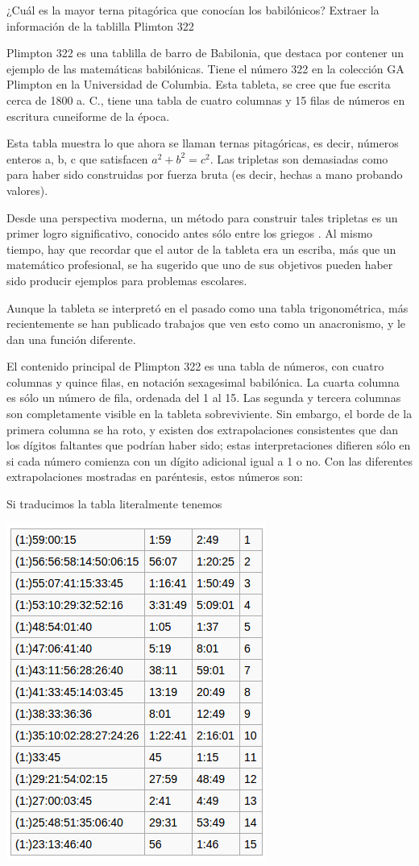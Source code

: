 \begin{problem}[3]
¿Cuál es la mayor terna pitagórica que conocían los babilónicos? Extraer la información de la tablilla Plimton 322

\solution

Plimpton 322 es una tablilla de barro de Babilonia, que destaca por contener un ejemplo de las matemáticas babilónicas. Tiene el número 322 en la colección GA Plimpton en la Universidad de Columbia. Esta tableta, se cree que fue escrita cerca de 1800 a. C., tiene una tabla de cuatro columnas y 15 filas de números en escritura cuneiforme de la época.

Esta tabla muestra lo que ahora se llaman ternas pitagóricas, es decir, números enteros a, b, c que satisfacen $a^2+b^2=c^2$. Las tripletas son demasiadas como para haber sido construidas por fuerza bruta (es decir, hechas a mano probando valores).

Desde una perspectiva moderna, un método para construir tales tripletas es un primer logro significativo, conocido antes sólo entre los griegos . Al mismo tiempo, hay que recordar que el autor de la tableta era un escriba, más que un matemático profesional, se ha sugerido que uno de sus objetivos pueden haber sido producir ejemplos para problemas escolares.

Aunque la tableta se interpretó en el pasado como una tabla trigonométrica, más recientemente se han publicado trabajos que ven esto como un anacronismo, y le dan una función diferente.

El contenido principal de Plimpton 322 es una tabla de números, con cuatro columnas y quince filas, en notación sexagesimal babilónica. La cuarta columna es sólo un número de fila, ordenada del 1 al 15. Las segunda y tercera columnas son completamente visible en la tableta sobreviviente. Sin embargo, el borde de la primera columna se ha roto, y existen dos extrapolaciones consistentes que dan los dígitos faltantes que podrían haber sido; estas interpretaciones difieren sólo en si cada número comienza con un dígito adicional igual a 1 o no. Con las diferentes extrapolaciones mostradas en paréntesis, estos números son:

Si traducimos la tabla literalmente tenemos
\begin{center}
\includegraphics[width=0.5\linewidth]{img/plimton_literal.png}
\end{center}


\end{problem}
